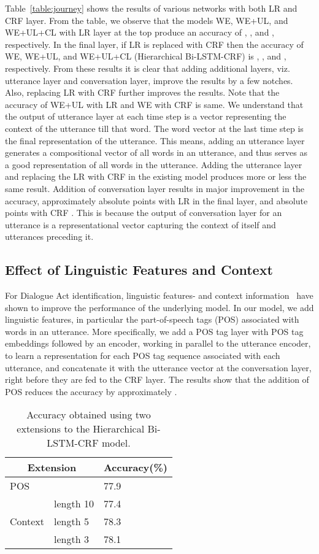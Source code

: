 \documentclass[letterpaper]{article} \usepackage{aaai18}
\begin{document}
Table~\ref{table:journey} shows the results of various networks with both LR and CRF layer. From the table, we observe that the models WE, WE+UL, and WE+UL+CL with LR layer at the top produce an accuracy of , , and , respectively. In the final layer, if LR is replaced with CRF then the accuracy of WE, WE+UL, and WE+UL+CL (Hierarchical Bi-LSTM-CRF) is , , and , respectively. From these results it is clear that adding additional layers, viz. utterance layer and conversation layer, improve the results by a few notches. Also, replacing LR with CRF further improves the results. Note that the accuracy of WE+UL with LR and WE with CRF is same. We understand that the output of utterance layer at each time step is a vector representing the context of the utterance till that word. The word vector at the last time step is the final representation of the utterance. This means, adding an utterance layer generates a compositional vector of all words in an utterance, and thus serves as a good representation of all words in the utterance. Adding the utterance layer and replacing the LR with CRF in the existing model produces more or less the same result. Addition of conversation layer results in major improvement in the accuracy, approximately  absolute points with LR in the final layer, and  absolute points with CRF . This is because the output of conversation layer for an utterance is a representational vector capturing the context of itself and utterances preceding it. 
\subsection{Effect of Linguistic Features and Context}
For Dialogue Act identification, linguistic features-\cite{Tavafi2013} and context information~\cite{ribeiro2015influence} have shown to improve the performance of the underlying model. In our model, we add linguistic features, in particular the part-of-speech tags (POS) associated with words in an utterance. More specifically, we add a POS tag layer with POS tag embeddings followed by an encoder, working in parallel to the utterance encoder, to learn a representation for each POS tag sequence associated with each utterance, and concatenate it with the utterance vector at the conversation layer, right before they are fed to the CRF layer. The results show that the addition of POS reduces the accuracy by approximately .
\begin{table}[h]
  \centering
  \small
  \begin{tabular}{@{}|c|l|l|@{}}
    \hline
    \multicolumn{2}{|c|}{\textbf{Extension}} 	& \textbf{Accuracy(\%)} \\\hline
    \multicolumn{2}{|l|}{POS} 								& 77.9 		\\ \hline
    \multirow{3}{*}{Context} 					& length 10 & 77.4 		\\
     											& length 5 	& 78.3 		\\
     											& length 3 	& 78.1 		\\ \hline
  \end{tabular}
  \caption{Accuracy obtained using two extensions to the Hierarchical Bi-LSTM-CRF model.}
  \label{table:extension}
\end{table}
\end{document}

